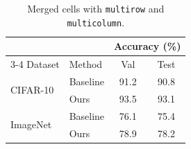 \documentclass{article}
\begin{document}
\begin{table}[htbp]
  \centering
  \caption{Merged cells with \texttt{multirow} and \texttt{multicolumn}.}
  \label{tab:merged}
  \begin{tabular}{@{}llcc@{}}
    \toprule
            &          & \multicolumn{2}{c}{Accuracy (\%)} \\
    \cmidrule(l){3-4}
    Dataset & Method   & Val  & Test \\
    \midrule
    \multirow{2}{*}{CIFAR-10} & Baseline & 91.2 & 90.8 \\
                              & Ours     & 93.5 & 93.1 \\
    \midrule
    \multirow{2}{*}{ImageNet} & Baseline & 76.1 & 75.4 \\
                              & Ours     & 78.9 & 78.2 \\
    \bottomrule
  \end{tabular}
\end{table}
\end{document}

